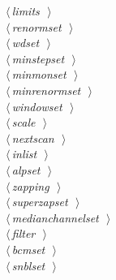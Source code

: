 \documentclass[10pt,a4paper,notitlepage]{article}
\begin{document}
\begin{flushleft}
\begin{minipage}{\linewidth}
\begin{list}{}{}
\mbox{}\verb@@\hbox{$\langle\,${\it limits}\nobreak\ {\footnotesize {}}$\,\rangle$}\verb@@\\
\mbox{}\verb@@\hbox{$\langle\,${\it renormset}\nobreak\ {\footnotesize {}}$\,\rangle$}\verb@@\\
\mbox{}\verb@@\hbox{$\langle\,${\it wdset}\nobreak\ {\footnotesize {}}$\,\rangle$}\verb@@\\
\mbox{}\verb@@\hbox{$\langle\,${\it minstepset}\nobreak\ {\footnotesize {}}$\,\rangle$}\verb@@\\
\mbox{}\verb@@\hbox{$\langle\,${\it minmonset}\nobreak\ {\footnotesize {}}$\,\rangle$}\verb@@\\
\mbox{}\verb@@\hbox{$\langle\,${\it minrenormset}\nobreak\ {\footnotesize {}}$\,\rangle$}\verb@@\\
\mbox{}\verb@@\hbox{$\langle\,${\it windowset}\nobreak\ {\footnotesize {}}$\,\rangle$}\verb@@\\
\mbox{}\verb@@\hbox{$\langle\,${\it scale}\nobreak\ {\footnotesize {}}$\,\rangle$}\verb@@\\
\mbox{}\verb@@\hbox{$\langle\,${\it nextscan}\nobreak\ {\footnotesize {}}$\,\rangle$}\verb@@\\
\mbox{}\verb@@\hbox{$\langle\,${\it inlist}\nobreak\ {\footnotesize {}}$\,\rangle$}\verb@@\\
\mbox{}\verb@@\hbox{$\langle\,${\it alpset}\nobreak\ {\footnotesize {}}$\,\rangle$}\verb@@\\
\mbox{}\verb@@\hbox{$\langle\,${\it zapping}\nobreak\ {\footnotesize {}}$\,\rangle$}\verb@@\\
\mbox{}\verb@@\hbox{$\langle\,${\it superzapset}\nobreak\ {\footnotesize {}}$\,\rangle$}\verb@@\\
\mbox{}\verb@@\hbox{$\langle\,${\it medianchannelset}\nobreak\ {\footnotesize {}}$\,\rangle$}\verb@@\\
\mbox{}\verb@@\hbox{$\langle\,${\it filter}\nobreak\ {\footnotesize {}}$\,\rangle$}\verb@@\\
\mbox{}\verb@@\hbox{$\langle\,${\it bcmset}\nobreak\ {\footnotesize {}}$\,\rangle$}\verb@@\\
\mbox{}\verb@@\hbox{$\langle\,${\it snblset}\nobreak\ {\footnotesize {}}$\,\rangle$}\verb@@\\

\end{list}
\end{minipage}
\end{flushleft}
\end{document}
